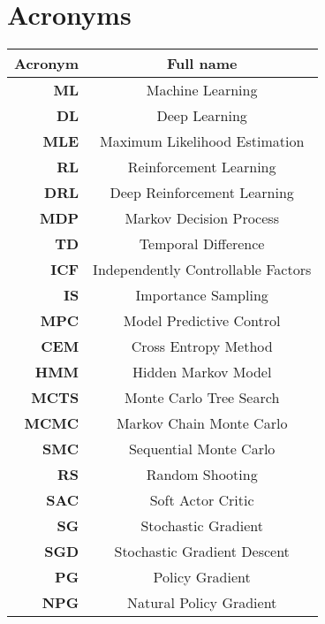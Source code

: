 \section*{Acronyms}
\begin{table}[H]%
\begin{center}%
\begin{tabular}{r c{10cm} }
\toprule
\textbf{Acronym} & \textbf{Full name}\\
\midrule
\textbf{ML} & Machine Learning\\
\textbf{DL} & Deep Learning\\
    \textbf{MLE} & Maximum Likelihood Estimation\\
\textbf{RL} & Reinforcement Learning\\
\textbf{DRL} & Deep Reinforcement Learning\\
\textbf{MDP} & Markov Decision Process\\
    \textbf{TD} & Temporal Difference\\
\textbf{ICF} & Independently Controllable Factors\\

\textbf{IS} & Importance Sampling\\
\textbf{MPC} & Model Predictive Control\\
    \textbf{CEM} & Cross Entropy Method\\
\textbf{HMM} & Hidden Markov Model\\
\textbf{MCTS} & Monte Carlo Tree Search\\
\textbf{MCMC} & Markov Chain Monte Carlo\\
    \textbf{SMC} & Sequential Monte Carlo\\
    \textbf{RS} & Random Shooting\\
    \textbf{SAC} & Soft Actor Critic\\
    \textbf{SG} & Stochastic Gradient\\
    \textbf{SGD} & Stochastic Gradient Descent\\
\textbf{PG} & Policy Gradient\\
\textbf{NPG} & Natural Policy Gradient\\
\bottomrule
\end{tabular}
\end{center}
\label{tab:acronyms}
\end{table}


